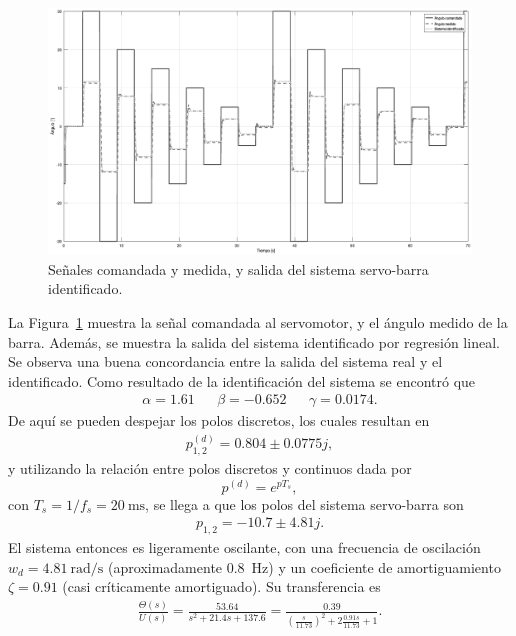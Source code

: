 \begin{figure}[!htbp]
    \centering
    \includegraphics[width=\linewidth]{img/ident-barra.eps}
    \caption{Señales comandada y medida, y salida del sistema servo-barra identificado.}
    \label{fig:ident-barra}
\end{figure}

La Figura~\ref{fig:ident-barra} muestra la señal comandada al servomotor, y el ángulo medido de la barra. Además, se muestra la salida del sistema identificado por regresión lineal. Se observa una buena concordancia entre la salida del sistema real y el identificado. Como resultado de la identificación del sistema se encontró que
\begin{align*}
    \alpha = 1.61 && \beta = -0.652 && \gamma = 0.0174.
\end{align*}
De aquí se pueden despejar los polos discretos, los cuales resultan en
\begin{align*}
    p_{1,2}^{(d)} = 0.804 \pm 0.0775j,
\end{align*}
y utilizando la relación entre polos discretos y continuos dada por
\[
    p^{(d)} = e^{p T_s},
\]
con $T_s = 1/f_s = \qty{20}{\ms}$, se llega a que los polos del sistema servo-barra son
\begin{align*}
    p_{1,2} = -10.7 \pm 4.81j.
\end{align*}
El sistema entonces es ligeramente oscilante, con una frecuencia de oscilación $w_d = \qty{4.81}{\radian\per\s}$ (aproximadamente \qty{0.8}{\Hz}) y un coeficiente de amortiguamiento $\zeta = 0.91$ (casi críticamente amortiguado). Su transferencia es
\begin{align}
    \label{eq:tf-servo-barra}
    \frac{\Theta(s)}{U(s)} = \frac{53.64}{s^2 + 21.4 s + 137.6}
    = \frac{0.39}{\left(\frac{s}{11.73}\right)^2 + 2 \frac{0.91 s}{11.73} + 1}.
\end{align}

